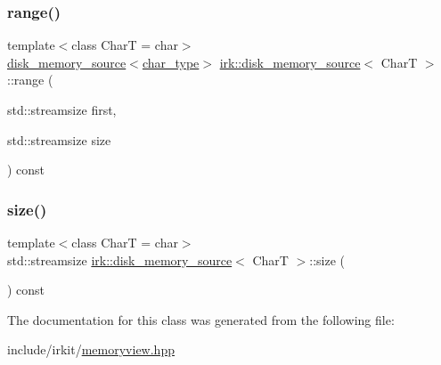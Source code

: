 \subsubsection{\texorpdfstring{range()}{range()}}
{\footnotesize\ttfamily template$<$class CharT  = char$>$ \\
\mbox{\hyperlink{classirk_1_1disk__memory__source}{disk\+\_\+memory\+\_\+source}}$<$\mbox{\hyperlink{classirk_1_1disk__memory__source_a029ab1ba55fc543025c42ee3d7320dca}{char\+\_\+type}}$>$ \mbox{\hyperlink{classirk_1_1disk__memory__source}{irk\+::disk\+\_\+memory\+\_\+source}}$<$ CharT $>$\+::range (\begin{DoxyParamCaption}\item[{std\+::streamsize}]{first,  }\item[{std\+::streamsize}]{size }\end{DoxyParamCaption}) const\hspace{0.3cm}{\ttfamily [inline]}}

\mbox{\label{classirk_1_1disk__memory__source_a6704788104e3593d275909ed0e558133}} 
\subsubsection{\texorpdfstring{size()}{size()}}
{\footnotesize\ttfamily template$<$class CharT  = char$>$ \\
std\+::streamsize \mbox{\hyperlink{classirk_1_1disk__memory__source}{irk\+::disk\+\_\+memory\+\_\+source}}$<$ CharT $>$\+::size (\begin{DoxyParamCaption}{ }\end{DoxyParamCaption}) const\hspace{0.3cm}{\ttfamily [inline]}}



The documentation for this class was generated from the following file\+:\begin{DoxyCompactItemize}
\item 
include/irkit/\mbox{\hyperlink{memoryview_8hpp}{memoryview.\+hpp}}\end{DoxyCompactItemize}
